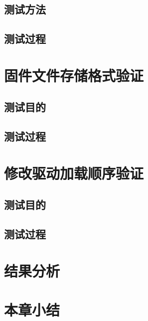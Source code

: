 \subsection{测试方法}

\subsection{测试过程}
%
%
\section{固件文件存储格式验证}

\subsection{测试目的}

\subsection{测试过程}
%
%
\section{修改驱动加载顺序验证}

\subsection{测试目的}

\subsection{测试过程}
%
%
\section{结果分析}

%
%
\section{本章小结}
